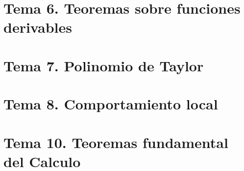 \documentclass[12pt, twoside, openright]{report} %
\begin{document}
\part{Tema 6. Teoremas sobre funciones derivables}











\part{Tema 7. Polinomio de Taylor}





















\part{Tema 8. Comportamiento local}







\part{Tema 10. Teoremas fundamental del Calculo}














\end{document}

